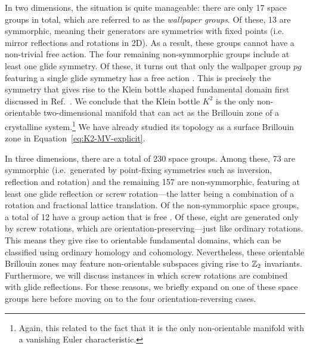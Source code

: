 In two dimensions, the situation is quite manageable: there are only 17 space groups in total, which are referred to as the \emph{wallpaper groups}. Of these, 13 are symmorphic, meaning their generators are symmetries with fixed points (i.e. mirror reflections and rotations in 2D). As a result, these groups cannot have a non-trivial free action. The four remaining non-symmorphic groups include at least one glide symmetry. Of these, it turns out that only the wallpaper group $pg$ featuring a single glide symmetry has a free action \cite{Michel_crystal-symmetry}. This is precisely the symmetry that gives rise to the Klein bottle shaped fundamental domain first discussed in Ref.~\cite{CYZ_Klein-gauge}. We conclude that the Klein bottle $K^2$ is the only non-orientable two-dimensional manifold that can act as the Brillouin zone of a crystalline system.\footnote{
	Again, this related to the fact that it is the only non-orientable manifold with a vanishing Euler characteristic.}
We have already studied its topology as a surface Brillouin zone in Equation~\eqref{eq:K2-MV-explicit}.

In three dimensions, there are a total of 230 space groups. Among these, 73 are symmorphic (i.e.\ generated by point-fixing symmetries such as inversion, reflection and rotation) and the remaining 157 are non-symmorphic, featuring at least one glide reflection or screw rotation---the latter being a combination of a rotation and fractional lattice translation. Of the non-symmorphic space groups, a total of 12 have a group action that is free \parencite[Eq. (110)]{Michel_crystal-symmetry}. Of these, eight are generated only by screw rotations, which are orientation-preserving---just like ordinary rotations. This means they give rise to orientable fundamental domains, which can be classified using ordinary homology and cohomology. Nevertheless, these orientable Brillouin zones may feature non-orientable subspaces giving rise to $\mathbb{Z}_2$ invariants. Furthermore, we will discuss instances in which screw rotations are combined with glide reflections. For these reasons, we briefly expand on one of these space groups here before moving on to the four orientation-reversing cases.

